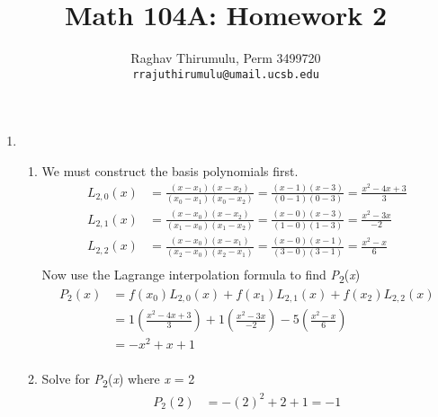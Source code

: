 \documentclass{article}
\begin{document}
\title{Math 104A: Homework 2}
\author{Raghav Thirumulu, Perm 3499720 \\ \texttt{rrajuthirumulu@umail.ucsb.edu}}
\maketitle

\begin{enumerate}
    \item %
        \begin{enumerate}
            \item %
                We must construct the basis polynomials first.
                \begin{align*}
                    L_{2,0}(x)    &= \frac{(x-x_{1})(x-x_{2})}{(x_{0}-x_{1})(x_{0}-x_{2})} =                           \frac{(x-1)(x-3)}{(0-1)(0-3)} =
                                     \frac{x^2-4x+3}{3}   \\
                    L_{2,1}(x)    &= \frac{(x-x_{0})(x-x_{2})}{(x_{1}-x_{0})(x_{1}-x_{2})} =                           \frac{(x-0)(x-3)}{(1-0)(1-3)} =
                                     \frac{x^2-3x}{-2}   \\
                    L_{2,2}(x)    &= \frac{(x-x_{0})(x-x_{1})}{(x_{2}-x_{0})(x_{2}-x_{1})} =                           \frac{(x-0)(x-1)}{(3-0)(3-1)} =
                                     \frac{x^2-x}{6}   \\
                \end{align*}    
                Now use the Lagrange interpolation formula to find \textit{P}\textsubscript{2}(\textit{x})
                \begin{align*}
                    P_{2}(x)  & = f(x_{0})L_{2,0}(x) + f(x_{1})L_{2,1}(x) + f(x_{2})L_{2,2}(x)\\
                              & = 1(\frac{x^2-4x+3}{3}) + 1(\frac{x^2-3x}{-2}) - 5(\frac{x^2-x}{6})\\
                              & = -x^2 + x + 1\\
                \end{align*}
            \item %
                Solve for \textit{P}\textsubscript{2}(\textit{x}) where \textit{x} = 2
                \begin{align*}
                    P_{2}(2)  & = -(2)^2 + 2 + 1 = -1\\
                \end{align*}
        \end{enumerate}

\end{enumerate}
\end{document}
